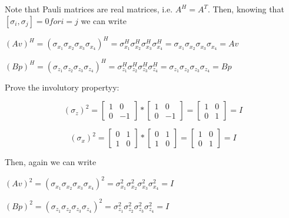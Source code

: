 \documentclass[12pt]{report}
\begin{document}
\begin{minipage}{1\textwidth}
		Note that Pauli matrices are real matrices, i.e. $A^H=A^T$.
		Then, knowing that $[\sigma_i,\sigma_j]=0 for i=j$ we can write		\newline
		
		\begin{center}
			$(Av)^{H} = (\sigma_{x_1} \sigma_{x_2} \sigma_{x_3} \sigma_{x_4})^{H} = \sigma_{x_1}^H \sigma_{x_2}^H \sigma_{x_3}^H \sigma_{x_4}^H = \sigma_{x_1} \sigma_{x_2} \sigma_{x_3} \sigma_{x_4} = Av$ \newline
			
			$(Bp)^{H} = (\sigma_{z_1} \sigma_{z_2} \sigma_{z_3} \sigma_{z_4})^{H} = \sigma_{z_1}^H \sigma_{z_2}^H \sigma_{z_3}^H \sigma_{z_4}^H = \sigma_{z_1} \sigma_{z_2} \sigma_{z_3} \sigma_{z_4} = Bp$\newline
		\end{center}
		
		Prove the involutory propertyy:\newline
		
		\[
		\text{$( \sigma_z )^{2}$} = 
		\begin{bmatrix}
			1 & 0 \\
			0 & -1
		\end{bmatrix} *
		\begin{bmatrix}
			1 & 0 \\
			0 & -1
		\end{bmatrix} =
		\begin{bmatrix}
			1 & 0 \\
			0 & 1
		\end{bmatrix}
		= \text{$I$}
		\]
		
		
		\[
		\text{$( \sigma_x )^{2}$} = 
		\begin{bmatrix}
			0 & 1 \\
			1 & 0
		\end{bmatrix} *
		\begin{bmatrix}
			0 & 1 \\
			1 & 0
		\end{bmatrix} =
		\begin{bmatrix}
			1 & 0 \\
			0 & 1
		\end{bmatrix}
		= \text{$I$}
		\]\newline
		
		
		Then, again we can write\newline
		
		\begin{center}
			$(Av)^{2} = (\sigma_{x_1} \sigma_{x_2} \sigma_{x_3} \sigma_{x_4})^{2} = \sigma_{x_1}^2 \sigma_{x_2}^2 \sigma_{x_3}^2 \sigma_{x_4}^2 = I$ \newline
			
			$(Bp)^{2} = (\sigma_{z_1} \sigma_{z_2} \sigma_{z_3} \sigma_{z_4})^{2} = \sigma_{z_1}^2 \sigma_{z_2}^2 \sigma_{z_3}^2 \sigma_{z_4}^2 = I$\newline
		\end{center}
		
	\end{minipage}    
	
\end{document}
